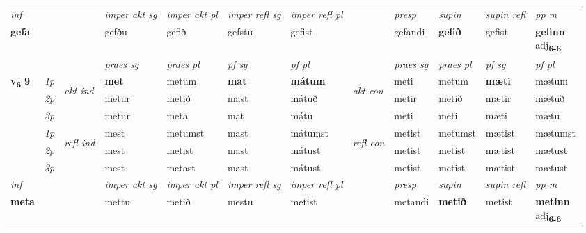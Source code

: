 \begin{longtable}[l]{X>{\footnotesize\itshape}llXXXXlXXXX}
\cmidrule{4-7}
   {\textit{inf}} & &  & \textit{imper akt sg} & \textit{imper akt pl} & \textit{imper refl sg} & \textit{imper refl pl} && \textit{presp} & \textit{supin} & \textit{supin refl} & \textit{pp m} \\*
  {\textbf{gefa}} & && gefðu  & gefið & gefstu & gefist && gefandi &  \textbf{gefið} & gefist & \specialcell{\textbf{gefinn} \\ adj\textbf{\textsubscript{6-6}}} \\*

\midrule

 & &   & \textit{praes sg}  & \textit{praes pl}    & \textit{ pf sg} & \textit{pf pl} & & \textit{praes sg}  & \textit{praes pl}    & \textit{pf sg} & \textit{pf pl }  \\ \cmidrule{4-7} \cmidrule{9-12}
 \multirow{2}{*}{{{\textbf{v{\textsubscript{6}}} \Large{\textbf{9}}}}}  & 1p & \multirow{3}{*}{\begin{turn}{90}\textit{akt ind}\end{turn}} & \textbf{met} & metum & \textbf{mat} & \textbf{mátum} & \multirow{3}{*}{\begin{turn}{90}\textit{akt con}\end{turn}} &meti & metum & \textbf{mæti} & mætum\\*
 & 2p &  &  metur  & metið & mast & mátuð & & metir & metið & mætir & mætuð \\*
 & 3p &  & metur & meta & mat & mátu & & meti & meti& mæti & mætu \\*
\cmidrule{4-7} \cmidrule{9-12}
 & 1p & \multirow{3}{*}{\begin{turn}{90}\textit{refl ind}\end{turn}}  & mest & metumst & mast & mátumst & \multirow{3}{*}{\begin{turn}{90}\textit{refl con}\end{turn}}  &metist & metumst & mætist & mætumst \\*
 & 2p &  & mest & metist & mast & mátust & &metist & metist & mætist & mætust \\*
 & 3p  & & mest & metast & mast & mátust & & metist & metist& mætist & mætust \\*
\cmidrule{4-7} \cmidrule{9-12}

   {\textit{inf}} & &  & \textit{imper akt sg} & \textit{imper akt pl} & \textit{imper refl sg} & \textit{imper refl pl} && \textit{presp} & \textit{supin} & \textit{supin refl} & \textit{pp m} \\*
  {\textbf{meta}} & && mettu  & metið & mestu & metist && metandi &  \textbf{metið} & metist & \specialcell{\textbf{metinn} \\ adj\textbf{\textsubscript{6-6}}} \\*


\end{longtable}
